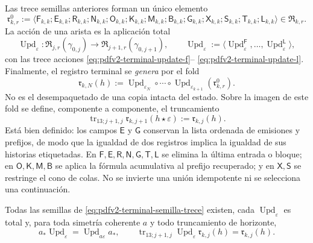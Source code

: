 Las trece semillas anteriores forman un único elemento
\begin{equation}
\label{eq:pdfv2-terminal-semilla-trece}
 \mathfrak r^0_{k,r}:=
 \langle
 \mathsf F_{k,k};\mathsf E_{k,k};\mathsf R_{k,k};\mathsf N_{k,k};
 \mathsf O_{k,k};\mathsf K_{k,k};\mathsf M_{k,k};\mathsf B_{k,k};
 \mathsf G_{k,k};\mathsf X_{k,k};\mathsf S_{k,k};\mathsf T_{k,k};
 \mathsf L_{k,k}
 \rangle\in\mathfrak R_{k,r}.
\end{equation}
La acción de una arista es la aplicación total
\begin{equation}
\label{eq:pdfv2-terminal-actualizacion-unica}
 \operatorname{Upd}_\varepsilon:
 \mathfrak R_{j,r}(\gamma_{0,j})
 \longrightarrow\mathfrak R_{j+1,r}(\gamma_{0,j+1}),\qquad
 \operatorname{Upd}_\varepsilon:=
 \langle\operatorname{Upd}^{\mathsf F}_\varepsilon,\ldots,
 \operatorname{Upd}^{\mathsf L}_\varepsilon\rangle,
\end{equation}
con las trece acciones
\eqref{eq:pdfv2-terminal-update-f}--
\eqref{eq:pdfv2-terminal-update-l}. Finalmente, el registro terminal se
\emph{genera} por el fold
\begin{equation}
\label{eq:pdfv2-terminal-registro-trece}
 \boxed{
 \mathfrak r_{k,N}(h):=
 \operatorname{Upd}_{\varepsilon_N}\circ\cdots\circ
 \operatorname{Upd}_{\varepsilon_{k+1}}(\mathfrak r^0_{k,r}).}
\end{equation}
No es el desempaquetado de una copia intacta del estado.
Sobre la imagen de este fold se define, componente a componente, el
truncamiento
\begin{equation}
\label{eq:pdfv2-terminal-truncamiento-trece-def}
 \operatorname{tr}_{13;j+1,j}
 \mathfrak r_{k,j+1}(h\star\varepsilon)
 :=\mathfrak r_{k,j}(h).
\end{equation}
Está bien definido: los campos \(\mathsf E\) y \(\mathsf G\) conservan la
lista ordenada de emisiones y prefijos, de modo que la igualdad de dos
registros implica la igualdad de sus historias etiquetadas. En
\(\mathsf F,\mathsf E,\mathsf R,\mathsf N,\mathsf G,\mathsf T,\mathsf L\)
se elimina la última entrada o bloque; en \(\mathsf O,\mathsf K,\mathsf M,
\mathsf B\) se aplica la fórmula acumulativa al prefijo recuperado; y en
\(\mathsf X,\mathsf S\) se restringe el cono de colas. No se invierte una
unión idempotente ni se selecciona una continuación.

\begin{proposition}
\label{prop:pdfv2-terminal-trece-total-natural}
Todas las semillas de \eqref{eq:pdfv2-terminal-semilla-trece} existen, cada
\(\operatorname{Upd}_\varepsilon\) es total y, para toda simetría coherente
\(a\) y todo truncamiento de horizonte,
\begin{equation}
\label{eq:pdfv2-terminal-trece-naturalidad}
 a_*\operatorname{Upd}_\varepsilon
 =\operatorname{Upd}_{a\varepsilon}a_*,
 \qquad
 \operatorname{tr}_{13;j+1,j}
 \operatorname{Upd}_\varepsilon\mathfrak r_{k,j}(h)
 =\mathfrak r_{k,j}(h).
\end{equation}
\end{proposition}

